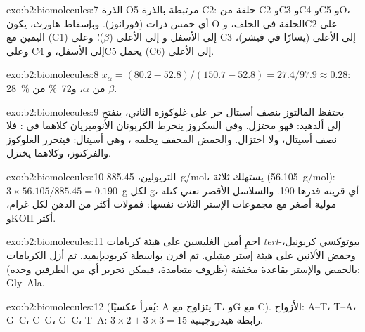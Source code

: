 \begin{solution}{exo:b2:biomolecules:7}
الذرة O5 مرتبطة بالذرة C2: حلقة من C2 وC3 وC4 وC5 وO، أي خمس ذرات (فورانوز). وبإسقاط هاورث، يكون O الحلقة
في الخلف، وC2 على اليمين مع  (C1) إلى الأسفل و إلى الأعلى ($\beta$)؛ وعلى C3  إلى الأعلى (يسارًا في
فيشر)، وعلى C4  إلى الأسفل، وC5 يحمل  (C6) إلى الأعلى.
\end{solution}

\begin{solution}{exo:b2:biomolecules:8}
$x_\alpha = (80.2 - 52.8)/(150.7 - 52.8) = 27.4/97.9 \approx 0.28$: 28~\% من $\alpha$، و72~\% من $\beta$.
\end{solution}

\begin{solution}{exo:b2:biomolecules:9}
يحتفظ المالتوز بنصف أسيتال حر على غلوكوزه الثاني، ينفتح إلى ألدهيد: فهو مختزل. وفي السكروز
ينخرط الكربونان الأنوميريان كلاهما في : فلا نصف أسيتال، ولا اختزال. والحمض المخفف
يحلمه ، وهي أسيتال: فيتحرر الغلوكوز والفركتوز، وكلاهما يختزل.
\end{solution}

\begin{solution}{exo:b2:biomolecules:10}
التريولين، \qty{885.45}{g/mol}، يستهلك ثلاثة  (\qty{56.105}{g/mol}): $3 \times 56.105/885.45 =
0.190$~g لكل g، أي قرينة  قدرها 190. والسلاسل الأقصر تعني كتلة مولية أصغر مع مجموعات
الإستر الثلاث نفسها: فمولات أكثر من الدهن لكل غرام، وKOH أكثر.
\end{solution}

\begin{solution}{exo:b2:biomolecules:11}
احمِ أمين الغليسين على هيئة كربامات \textit{tert}-بيوتوكسي كربونيل، وحمض الألانين على هيئة
إستر ميثيلي. ثم اقرن بواسطة كربوديإيميد. ثم أزل الكربامات بالحمض والإستر بقاعدة مخففة
(ظروف متعامدة، فيمكن تحرير أي من الطرفين وحده): Gly--Ala.
\end{solution}

\begin{solution}{exo:b2:biomolecules:12}
 (يُقرأ عكسيًا: A يتزاوج مع T، وG مع C). الأزواج: A--T، T--A، G--C، C--G، G--C، T--A:
$3 \times 2 + 3 \times 3 = 15$ رابطة هيدروجينية.
\end{solution}

